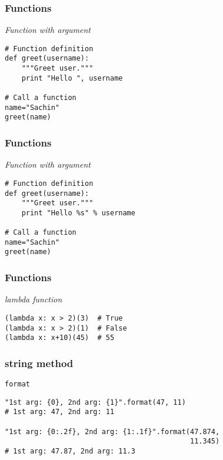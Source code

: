 \documentclass[bigger, presentation]{beamer}
\begin{document}
\begin{frame}[fragile]
\frametitle{Functions}
\label{sec-2-11}

   \emph{Function with argument}


\begin{verbatim}
# Function definition
def greet(username):
    """Greet user."""
    print "Hello ", username

# Call a function
name="Sachin"
greet(name)
\end{verbatim}
\end{frame}
\begin{frame}[fragile]
\frametitle{Functions}
\label{sec-2-12}

   \emph{Function with argument}


\begin{verbatim}
# Function definition
def greet(username):
    """Greet user."""
    print "Hello %s" % username

# Call a function
name="Sachin"
greet(name)
\end{verbatim}
\end{frame}
\begin{frame}[fragile]
\frametitle{Functions}
\label{sec-2-13}

   \emph{lambda function}


\begin{verbatim}
(lambda x: x > 2)(3)  # True
(lambda x: x > 2)(1)  # False
(lambda x: x+10)(45)  # 55
\end{verbatim}
\end{frame}
\begin{frame}[fragile]
\frametitle{string method}
\label{sec-2-14}

   \texttt{format}

\begin{verbatim}
"1st arg: {0}, 2nd arg: {1}".format(47, 11)
# 1st arg: 47, 2nd arg: 11

"1st arg: {0:.2f}, 2nd arg: {1:.1f}".format(47.874,
                                            11.345)
# 1st arg: 47.87, 2nd arg: 11.3
\end{verbatim}
\end{frame}
\end{document}
